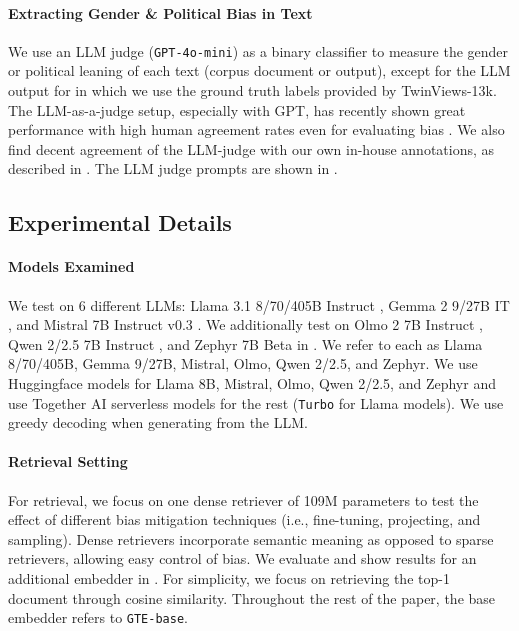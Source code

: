 \paragraph{Extracting Gender \& Political Bias in Text}
We use an LLM judge (\texttt{GPT-4o-mini}) as a binary classifier to measure the gender or political leaning of each text (corpus document or output), except for the LLM output for \politicalData in which we use the ground truth labels provided by TwinViews-13k. The LLM-as-a-judge setup, especially with GPT, has recently shown great performance with high human agreement rates \citep{zheng2023judging} even for evaluating bias \citep{kumar2024decoding}. We also find decent agreement of the LLM-judge with our own in-house annotations, as described in . The LLM judge prompts are shown in .

\subsection{Experimental Details}\label{sec:exp-details}
\paragraph{Models Examined} 
We test on 6 different LLMs: Llama 3.1 8/70/405B Instruct \citep{dubey2024llama}, Gemma 2 9/27B IT \citep{team2024gemma}, and Mistral 7B Instruct v0.3 \citep{jiang2023mistral7b}. We additionally test on Olmo 2 7B Instruct \citep{olmo20242}, Qwen 2/2.5 7B Instruct \citep{yang2024qwen2technicalreport, yang2024qwen2}, and Zephyr 7B Beta \citep{tunstall2023zephyr} in . We refer to each as Llama 8/70/405B, Gemma 9/27B, Mistral, Olmo, Qwen 2/2.5, and Zephyr. We use Huggingface models for Llama 8B, Mistral, Olmo, Qwen 2/2.5, and Zephyr and use Together AI serverless models for the rest (\texttt{Turbo} for Llama models). We use greedy decoding when generating from the LLM.

\paragraph{Retrieval Setting}
For retrieval, we focus on one dense retriever \citep[\texttt{GTE-base};][]{li2023towards} of 109M parameters to test the effect of different bias mitigation techniques (i.e., fine-tuning, projecting, and sampling). Dense retrievers incorporate semantic meaning as opposed to sparse retrievers, allowing easy control of bias. We evaluate and show results for an additional embedder \citep[\texttt{E5-base-v2};][]{wang2022text} in . For simplicity, we focus on retrieving the top-1 document through cosine similarity. Throughout the rest of the paper, the base embedder refers to \texttt{GTE-base}.

